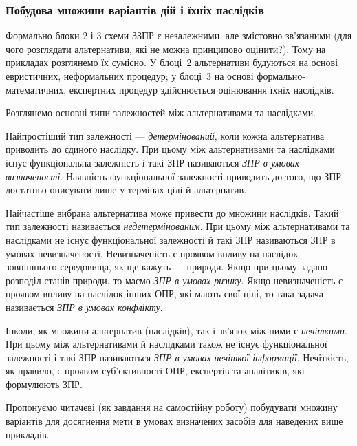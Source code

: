 \documentclass[a4paper, 12pt]{article}
\begin{document}
\subsubsection{Побудова множини варіантів дій і їхніх наслідків}

Формально блоки 2 і 3 схеми ЗЗПР є незалежними, але змістовно зв'язаними (для чого розглядати альтернативи, які не можна принципово оцінити?). Тому на прикладах розглянемо їх сумісно. У блоці~2 альтернативи будуються на основі евристичних, неформальних процедур; у блоці~3 на основі формально-математичних, експертних процедур здійснюється оцінювання їхніх наслідків. \medskip

Розглянемо основні типи залежностей між альтернативами та наслідками.

\begin{definition}
	Найпростіший тип залежності --- \textit{детермінований}, коли кожна альтернатива приводить до єдиного наслідку. При цьому між альтернативами та наслідками існує функціональна залежність і такі ЗПР називаються \textit{ЗПР в умовах визначеності}. Наявність функціональної залежності приводить до того, що ЗПР достатньо описувати лише у термінах цілі й альтернатив.
\end{definition}

\begin{definition}
	Найчастіше вибрана альтернатива може привести до множини наслідків. Такий тип залежності називається \textit{недетермінованим}. При цьому між альтернативами та наслідками не існує функціональної залежності й такі ЗПР називаються ЗПР в умовах невизначеності. Невизначеність є проявом впливу на наслідок зовнішнього середовища, як ще кажуть --- природи. Якщо при цьому задано розподіл станів природи, то маємо \textit{ЗПР в умовах ризику}. Якщо невизначеність є проявом впливу на наслідок інших ОПР, які мають свої цілі, то така задача називається \textit{ЗПР в умовах конфлікту}.
\end{definition}

\begin{definition}
	Інколи, як множини альтернатив (наслідків), так і зв'язок між ними є \textit{нечіткими}. При цьому між альтернативами й наслідками також не існує функціональної залежності і такі ЗПР називаються \textit{ЗПР в умовах нечіткої інформації}. Нечіткість, як правило, є проявом суб'єктивності ОПР, експертів та аналітиків, які формулюють ЗПР.
\end{definition}

Пропонуємо читачеві (як завдання на самостійну роботу) побудувати множину варіантів для досягнення мети в умовах визначених засобів для наведених вище прикладів.
\end{document}
